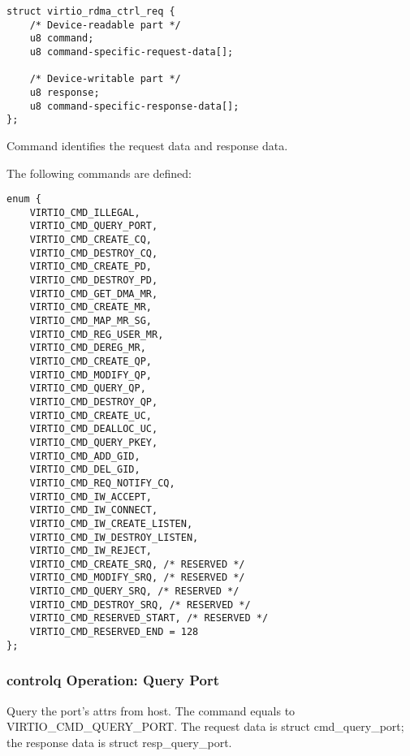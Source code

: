 \begin{lstlisting}
struct virtio_rdma_ctrl_req {
    /* Device-readable part */
    u8 command;
    u8 command-specific-request-data[];
    
    /* Device-writable part */
    u8 response;
    u8 command-specific-response-data[];
};
\end{lstlisting}

Command identifies the request data and response data.

The following commands are defined:

\begin{lstlisting}
enum {
    VIRTIO_CMD_ILLEGAL,
    VIRTIO_CMD_QUERY_PORT,
    VIRTIO_CMD_CREATE_CQ,
    VIRTIO_CMD_DESTROY_CQ,
    VIRTIO_CMD_CREATE_PD,
    VIRTIO_CMD_DESTROY_PD,
    VIRTIO_CMD_GET_DMA_MR,
    VIRTIO_CMD_CREATE_MR,
    VIRTIO_CMD_MAP_MR_SG,
    VIRTIO_CMD_REG_USER_MR,
    VIRTIO_CMD_DEREG_MR,
    VIRTIO_CMD_CREATE_QP,
    VIRTIO_CMD_MODIFY_QP,
    VIRTIO_CMD_QUERY_QP,
    VIRTIO_CMD_DESTROY_QP,
    VIRTIO_CMD_CREATE_UC,
    VIRTIO_CMD_DEALLOC_UC,
    VIRTIO_CMD_QUERY_PKEY,
    VIRTIO_CMD_ADD_GID,
    VIRTIO_CMD_DEL_GID,
    VIRTIO_CMD_REQ_NOTIFY_CQ,
    VIRTIO_CMD_IW_ACCEPT,
    VIRTIO_CMD_IW_CONNECT,
    VIRTIO_CMD_IW_CREATE_LISTEN,
    VIRTIO_CMD_IW_DESTROY_LISTEN,
    VIRTIO_CMD_IW_REJECT,
    VIRTIO_CMD_CREATE_SRQ, /* RESERVED */
    VIRTIO_CMD_MODIFY_SRQ, /* RESERVED */
    VIRTIO_CMD_QUERY_SRQ, /* RESERVED */
    VIRTIO_CMD_DESTROY_SRQ, /* RESERVED */
    VIRTIO_CMD_RESERVED_START, /* RESERVED */
    VIRTIO_CMD_RESERVED_END = 128
};
\end{lstlisting}

\subsubsection{controlq Operation: Query Port}\label{sec:Device Types / RDMA Device / controlq Operation / Query Port}

Query the port's attrs from host. The command equals to VIRTIO_CMD_QUERY_PORT.
The request data is struct cmd_query_port; the response data is struct resp_query_port.

